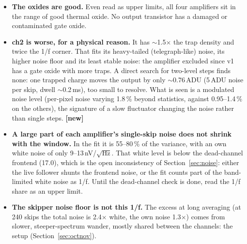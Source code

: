 \documentclass[11pt]{article}
\newcommand{\novel}{\textcolor{blue!60!black}{\textbf{[new]}}}
\begin{document}
\begin{itemize}
\item \textbf{The oxides are good.} Even read as upper limits, all four amplifiers sit in the range of good thermal oxide.
  No output transistor has a damaged or contaminated gate oxide.
\item \textbf{ch2 is worse, for a physical reason.} It has $\sim$1.5$\times$ the trap density and twice the 1/f corner.
  That fits its heavy-tailed (telegraph-like) noise, its higher noise floor and its least stable noise: the amplifier
  excluded since v1 has a gate oxide with more traps. A direct search for two-level steps finds none: one trapped
  charge moves the output by only $\sim$0.76\,ADU (5\,ADU noise per skip, dwell $\sim$0.2\,ms), too small to resolve. What
  is seen is a modulated noise level (per-pixel noise varying 1.8\,\% beyond statistics, against 0.95--1.4\,\% on the
  others), the signature of a slow fluctuator changing the noise rather than single steps. \novel
\item \textbf{A large part of each amplifier's single-skip noise does not shrink with the window.} In the fit it is
  55--80\,\% of the variance, with an own white noise of only 9--13\,nV/$\sqrt{\text{Hz}}$. That white level is below
  the dead-channel frontend (17.0), which is the open inconsistency of Section~\ref{sec:noise}: either the live follower
  shunts the frontend noise, or the fit counts part of the band-limited white noise as 1/f. Until the dead-channel
  check is done, read the 1/f share as an upper limit.
\item \textbf{The skipper noise floor is not this 1/f.} The excess at long averaging (at 240 skips the total noise is
  2.4$\times$ white, the own noise 1.3$\times$) comes from slower, steeper-spectrum wander, mostly shared between the
  channels: the setup (Section~\ref{sec:octnov}).
\end{itemize}
\end{document}
